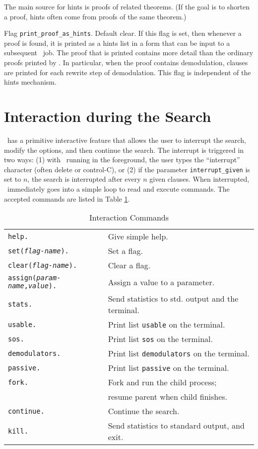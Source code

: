 \documentclass[11pt]{article}
\begin{document}
The main source for hints is proofs of related theorems.
(If the goal is to shorten a proof, hints often come from
proofs of the same theorem.)

\noindent
Flag \verb:print_proof_as_hints:.  Default clear.
If this flag is set, then whenever a proof is found,
it is printed as a hints list in a form that can
be input to a subsequent \otter\ job.  The proof
that is printed contains more detail than the ordinary
proofs printed by \otter.  In particular, when the proof
contains demodulation, clauses are printed for each rewrite
step of demodulation.
This flag is independent of the hints mechanism.

\section{Interaction during the Search} \label{interact}

\otter\ has a primitive interactive feature that allows the user to
interrupt the search, modify the options, and then continue the
search.  The interrupt is triggered in two ways: (1) with \otter\ running in
the foreground, the user types the ``interrupt'' character (often {\sc
delete} or control-C), or (2) if the parameter \verb:interrupt_given:
is set to $n$, the search is interrupted after every $n$ given clauses.
When interrupted, \otter\ immediately goes into a simple loop to read
and execute commands.
The accepted commands are listed in Table \ref{interact-tab}.
\begin{table}[htbf] \centering \small
\caption{Interaction Commands} \label{interact-tab}
\begin{tabular}{ll} \hline
{\tt help.}  &  Give simple help. \\
{\tt set({\it flag-name}).} & Set a flag. \\
{\tt clear({\it flag-name}).}  & Clear a flag.\\
{\tt assign({\it param-name},{\it value}).} & Assign a value to a parameter. \\
{\tt stats.} & Send statistics to std. output and the terminal. \\
{\tt usable.} & Print list \verb:usable: on the terminal. \\
{\tt sos.} & Print list \verb:sos: on the terminal. \\
{\tt demodulators.} & Print list \verb:demodulators: on the terminal. \\
{\tt passive.} & Print list \verb:passive: on the terminal. \\
{\tt fork.} & Fork and run the child process; \\
            & \hspace{1cm} resume parent when child finishes. \\
{\tt continue.} & Continue the search. \\
{\tt kill.} & Send statistics to standard output, and exit. \\
\hline
\end{tabular}
\end{table}
\end{document}
